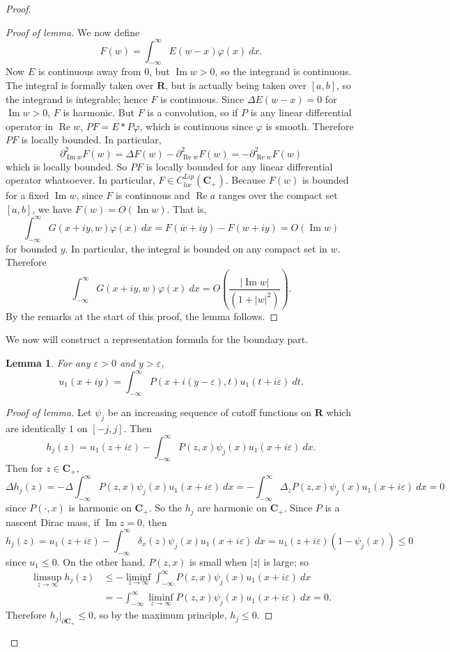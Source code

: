 \documentclass[12pt]{report}
\newcommand{\RR}{\mathbf{R}}
\newcommand{\CC}{\mathbf{C}}
\renewcommand{\Re}{\operatorname{Re}}
\renewcommand{\Im}{\operatorname{Im}}
\newtheorem{lemma}[theorem]{Lemma}
\theoremstyle{definition}
\theoremstyle{remark}
\begin{document}
\begin{proof}
\begin{proof}[Proof of lemma]
    We now define
$$F(w) = \int_{-\infty}^\infty E(w - x)\varphi(x) ~dx.$$
    Now $E$ is continuous away from $0$, but $\Im w > 0$, so the integrand is continuous. The integral is formally taken over $\RR$, but is actually being taken over $[a, b]$, so the integrand is integrable; hence $F$ is continuous. Since $\Delta E(w - x) = 0$ for $\Im w > 0$, $F$ is harmonic. But $F$ is a convolution, so if $P$ is any linear differential operator in $\Re w$, $PF = E * P\varphi$, which is continuous since $\varphi$ is smooth. Therefore $PF$ is locally bounded. In particular,
$$\partial_{\Im w}^2 F(w) = \Delta F(w) - \partial_{\Re w}^2 F(w) = -\partial_{\Re w}^2 F(w)$$
    which is locally bounded. So $PF$ is locally bounded for any linear differential operator whatsoever. In particular, $F \in C^{Lip}_{loc}(\CC_+)$. Because $F(w)$ is bounded for a fixed $\Im w$, since $F$ is continuous and $\Re a$ ranges over the compact set $[a, b]$, we have $F(w) = O(\Im w)$. That is,
$$\int_{-\infty}^\infty G(x + iy, w) \varphi(x) ~dx = F(\overline w + iy) - F(w + iy) = O(\Im w)$$
    for bounded $y$. In particular, the integral is bounded on any compact set in $w$. Therefore
$$\int_{-\infty}^\infty G(x + iy, w) \varphi(x) ~dx = O\left(\frac{|\Im w|}{(1 + |w|^2)}\right).$$
    By the remarks at the start of this proof, the lemma follows.
\end{proof}
    We now will construct a representation formula for the boundary part.
\begin{lemma}
  \label{approximate sigma rep}
    For any $\varepsilon > 0$ and $y > \varepsilon$,
$$u_1(x + iy) = \int_{-\infty}^\infty P(x + i(y-\varepsilon), t) u_1(t + i\varepsilon) ~dt.$$
\end{lemma}
\begin{proof}[Proof of lemma]
    Let $\psi_j$ be an increasing sequence of cutoff functions on $\RR$ which are identically $1$ on $[-j, j]$. Then
$$h_j(z) = u_1(z + i\varepsilon) - \int_{-\infty}^\infty P(z, x)\psi_j(x)u_1(x + i\varepsilon) ~dx.$$
    Then for $z \in \CC_+$,
$$\Delta h_j(z) = -\Delta \int_{-\infty}^\infty P(z, x)\psi_j(x) u_1(x + i\varepsilon) ~dx = -\int_{-\infty}^\infty \Delta_z P(z, x) \psi_j(x) u_1(x + i\varepsilon) ~dx = 0$$
    since $P(\cdot, x)$ is harmonic on $\CC_+$. So the $h_j$ are harmonic on $\CC_+$. Since $P$ is a nascent Dirac mass, if $\Im z = 0$, then
$$h_j(z) = u_1(z + i\varepsilon) - \int_{-\infty}^\infty \delta_x(z) \psi_j(x) u_1(x + i\varepsilon) ~dx = u_1(z + i\varepsilon)(1 - \psi_j(x)) \leq 0$$
    since $u_1 \leq 0$. On the other hand, $P(z, x)$ is small when $|z|$ is large; so
    \begin{align*}\limsup_{z \to \infty} h_j(z) &\leq -\liminf_{z \to \infty} \int_{-\infty}^\infty P(z, x) \psi_j(x) u_1(x + i\varepsilon) ~dx
      \\&= -\int_{-\infty}^\infty \liminf_{z \to \infty} P(z, x) \psi_j(x) u_1(x + i\varepsilon) ~dx = 0.\end{align*}
    Therefore $h_j|_{\partial \CC_+} \leq 0$, so by the maximum principle, $h_j \leq 0$.


\end{proof}
\end{proof}
\end{document}
